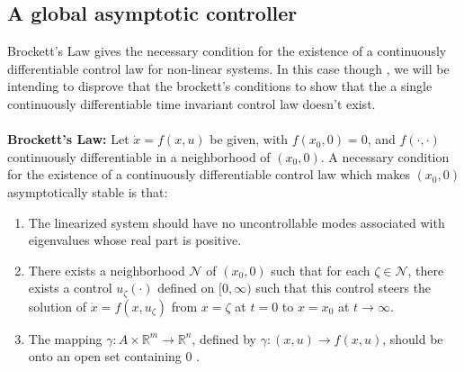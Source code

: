\documentclass{article}
\begin{document}
\subsection{A global asymptotic controller}
Brockett's Law gives the necessary condition for the existence of
a continuously differentiable control law for non-linear systems. In this 
case though , we will be intending to disprove that the brockett's conditions
to show that the a single continuously differentiable time invariant control law 
doesn't exist.
\\
\\
\textbf{Brockett's Law:}
Let \( \dot{x} = f(x, u) \) be given, with \( f(x_0, 0) = 0 \), and \( f(\cdot, \cdot) \) continuously differentiable in a neighborhood of \( (x_0, 0) \). A necessary condition for the existence of a continuously differentiable control law which makes \( (x_0, 0) \) asymptotically stable is that:
\\
\begin{enumerate}
    \item The linearized system should have no uncontrollable modes associated with eigenvalues whose real part is positive.
    
    \item There exists a neighborhood \( \mathcal{N} \) of \( (x_0, 0) \) such that for each \( \zeta \in \mathcal{N} \), there exists a control \( u_\zeta(\cdot) \) defined on \( [0, \infty) \) such that this control steers the solution of \( \dot{x} = f(x, u_\zeta) \) from \( x = \zeta \) at \( t = 0 \) to \( x = x_0 \) at \( t \to \infty \).
    
    \item The mapping \( \gamma : A \times \mathbb{R}^m \to \mathbb{R}^n \), defined by \( \gamma : (x, u) \to f(x, u) \), should be onto an open set containing 0 .
\end{enumerate}
\end{document}
